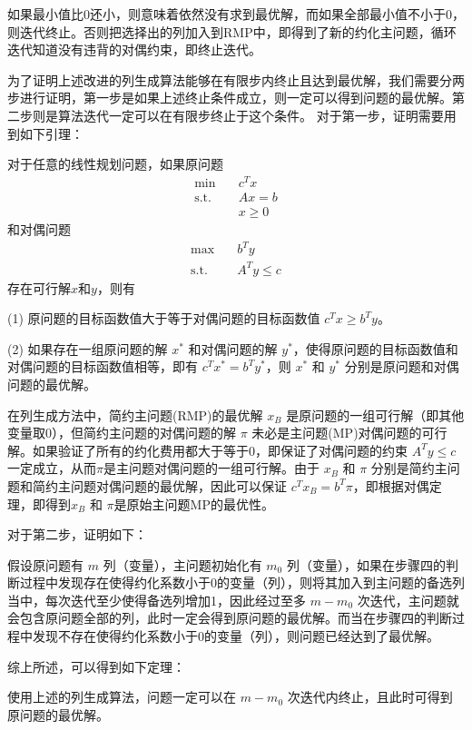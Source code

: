 如果最小值比$0$还小，则意味着依然没有求到最优解，而如果全部最小值不小于0，则迭代终止。否则把选择出的列加入到RMP中，即得到了新的约化主问题，循环迭代知道没有违背的对偶约束，即终止迭代。

为了证明上述改进的列生成算法能够在有限步内终止且达到最优解，我们需要分两步进行证明，第一步是如果上述终止条件成立，则一定可以得到问题的最优解。第二步则是算法迭代一定可以在有限步终止于这个条件。
对于第一步，证明需要用到如下引理：
\begin{lemma}[对偶定理]
    对于任意的线性规划问题，如果原问题
\begin{align*}
    \text{min} \quad & c^T x \\
    \text{s.t.} \quad & Ax = b \\
    & x \geq 0
\end{align*}
和对偶问题
\begin{align*}
    \text{max} \quad & b^T y \\
    \text{s.t.} \quad & A^T y \leq c
\end{align*}
存在可行解$x$和$y$，则有

(1) 原问题的目标函数值大于等于对偶问题的目标函数值 $c^T x \geq b^T y$。

(2) 如果存在一组原问题的解 $x^*$ 和对偶问题的解 $y^*$，使得原问题的目标函数值和对偶问题的目标函数值相等，即有 $c^T x^* = b^T y^*$，则 $x^*$ 和 $y^*$ 分别是原问题和对偶问题的最优解。
\end{lemma}

在列生成方法中，简约主问题(RMP)的最优解 $x_B$ 是原问题的一组可行解（即其他变量取0），但简约主问题的对偶问题的解 $\pi$ 未必是主问题(MP)对偶问题的可行解。如果验证了所有的约化费用都大于等于0，即保证了对偶问题的约束 $A^T y \leq c$ 一定成立，从而$\pi$是主问题对偶问题的一组可行解。由于 $x_B$ 和 $\pi$ 分别是简约主问题和简约主问题对偶问题的最优解，因此可以保证 $c^T x_B = b^T \pi$，即根据对偶定理，即得到$x_B$ 和 $\pi$是原始主问题MP的最优性。

对于第二步，证明如下：

假设原问题有 $m$ 列（变量），主问题初始化有 $m_0$ 列（变量），如果在步骤四的判断过程中发现存在使得约化系数小于0的变量（列），则将其加入到主问题的备选列当中，每次迭代至少使得备选列增加1，因此经过至多 $m-m_0$ 次迭代，主问题就会包含原问题全部的列，此时一定会得到原问题的最优解。而当在步骤四的判断过程中发现不存在使得约化系数小于0的变量（列），则问题已经达到了最优解。

综上所述，可以得到如下定理：

\begin{theorem}
    使用上述的列生成算法，问题一定可以在 $m-m_0$ 次迭代内终止，且此时可得到原问题的最优解。
\end{theorem}
    

